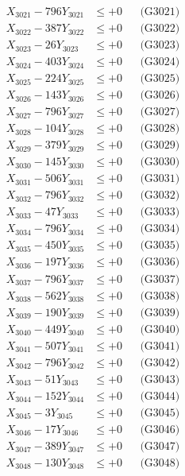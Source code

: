 \documentclass[a4paper,10pt]{article}
\begin{document}
{\begin{align}
\allowbreak
X_{3021} - 796Y_{3021} &\leq +0 && \text{(G3021)} \\
X_{3022} - 387Y_{3022} &\leq +0 && \text{(G3022)} \\
X_{3023} - 26Y_{3023} &\leq +0 && \text{(G3023)} \\
X_{3024} - 403Y_{3024} &\leq +0 && \text{(G3024)} \\
X_{3025} - 224Y_{3025} &\leq +0 && \text{(G3025)} \\
X_{3026} - 143Y_{3026} &\leq +0 && \text{(G3026)} \\
X_{3027} - 796Y_{3027} &\leq +0 && \text{(G3027)} \\
X_{3028} - 104Y_{3028} &\leq +0 && \text{(G3028)} \\
X_{3029} - 379Y_{3029} &\leq +0 && \text{(G3029)} \\
X_{3030} - 145Y_{3030} &\leq +0 && \text{(G3030)} \\
\allowbreak
X_{3031} - 506Y_{3031} &\leq +0 && \text{(G3031)} \\
X_{3032} - 796Y_{3032} &\leq +0 && \text{(G3032)} \\
X_{3033} - 47Y_{3033} &\leq +0 && \text{(G3033)} \\
X_{3034} - 796Y_{3034} &\leq +0 && \text{(G3034)} \\
X_{3035} - 450Y_{3035} &\leq +0 && \text{(G3035)} \\
X_{3036} - 197Y_{3036} &\leq +0 && \text{(G3036)} \\
X_{3037} - 796Y_{3037} &\leq +0 && \text{(G3037)} \\
X_{3038} - 562Y_{3038} &\leq +0 && \text{(G3038)} \\
X_{3039} - 190Y_{3039} &\leq +0 && \text{(G3039)} \\
X_{3040} - 449Y_{3040} &\leq +0 && \text{(G3040)} \\
\allowbreak
X_{3041} - 507Y_{3041} &\leq +0 && \text{(G3041)} \\
X_{3042} - 796Y_{3042} &\leq +0 && \text{(G3042)} \\
X_{3043} - 51Y_{3043} &\leq +0 && \text{(G3043)} \\
X_{3044} - 152Y_{3044} &\leq +0 && \text{(G3044)} \\
X_{3045} - 3Y_{3045} &\leq +0 && \text{(G3045)} \\
X_{3046} - 17Y_{3046} &\leq +0 && \text{(G3046)} \\
X_{3047} - 389Y_{3047} &\leq +0 && \text{(G3047)} \\
X_{3048} - 130Y_{3048} &\leq +0 && \text{(G3048)} \\

\end{align}}
\end{document}
